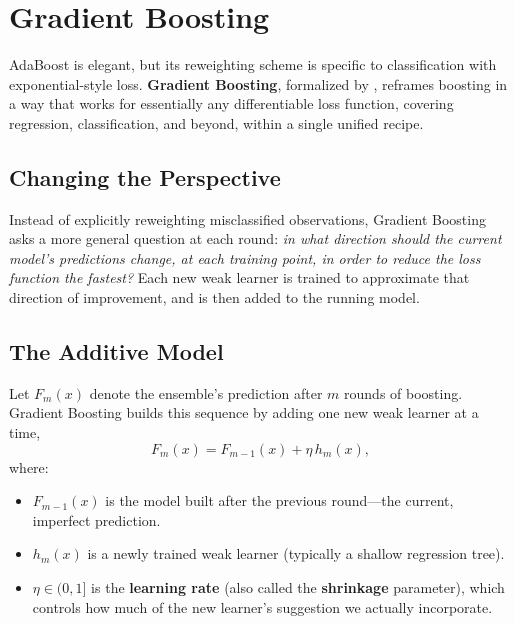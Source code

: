 \documentclass[12pt,a4paper]{article}
\begin{document}
\section{Gradient Boosting}

AdaBoost is elegant, but its reweighting scheme is specific to classification with exponential-style loss. \textbf{Gradient Boosting}, formalized by \citet{friedman2001gradientboosting}, reframes boosting in a way that works for essentially any differentiable loss function, covering regression, classification, and beyond, within a single unified recipe.

\subsection{Changing the Perspective}

Instead of explicitly reweighting misclassified observations, Gradient Boosting asks a more general question at each round: \emph{in what direction should the current model's predictions change, at each training point, in order to reduce the loss function the fastest?} Each new weak learner is trained to approximate that direction of improvement, and is then added to the running model.

\subsection{The Additive Model}

Let $F_{m}(x)$ denote the ensemble's prediction after $m$ rounds of boosting. Gradient Boosting builds this sequence by adding one new weak learner at a time,
\begin{equation}
\label{eq:gb-additive}
F_m(x) = F_{m-1}(x) + \eta \, h_m(x),
\end{equation}
where:
\begin{itemize}[nosep]
    \item $F_{m-1}(x)$ is the model built after the previous round---the current, imperfect prediction.
    \item $h_m(x)$ is a newly trained weak learner (typically a shallow regression tree).
    \item $\eta \in (0, 1]$ is the \textbf{learning rate} (also called the \textbf{shrinkage} parameter), which controls how much of the new learner's suggestion we actually incorporate.
\end{itemize}
\end{document}
